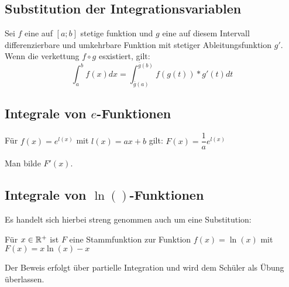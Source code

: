 \documentclass[main.tex]{subfiles}
\begin{document}
\subsection{Substitution der Integrationsvariablen}
\begin{Theorem}
  Sei $f$ eine auf $[a;b]$ stetige funktion und $g$ eine auf diesem Intervall differenzierbare und umkehrbare Funktion mit stetiger
  Ableitungsfunktion $g'$. Wenn die verkettung $f \circ g$ esxistiert, gilt:
  $$\int_a^b f(x)dx=\int_{\bar g (a)}^{\bar g (b)}f(g(t))*g'(t)dt$$
\end{Theorem}

\subsection{Integrale von $e$-Funktionen}
\begin{Theorem}
  Für $f(x)=e^{l(x)}$ mit $l(x) = ax+b$ gilt: $F(x) = \dfrac{1}{a}e^{l(x)}$
\end{Theorem}
\begin{Beweis}
  Man bilde $F'(x)$.
\end{Beweis}
\subsection{Integrale von $\ln()$-Funktionen}
Es handelt sich hierbei streng genommen auch um eine Substitution:
\begin{Theorem}
  Für $x \in \mathbb{R}^{+}$ ist $F$ eine Stammfunktion zur Funktion $f(x) = \ln(x)$ mit $F(x) = x \ln(x)-x$
\end{Theorem}
\begin{Beweis}
  Der Beweis erfolgt über partielle Integration und wird dem Schüler als Übung überlassen.
\end{Beweis}
\end{document}
